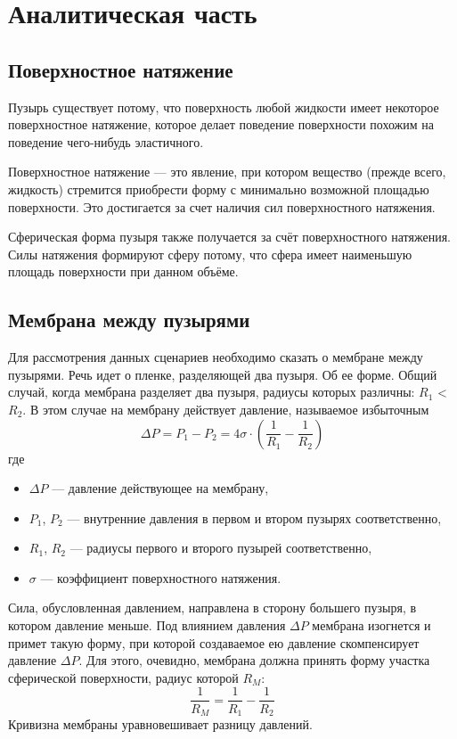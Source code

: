 \chapter{Аналитическая часть}
\section{Поверхностное натяжение}
Пузырь существует потому, что поверхность любой жидкости имеет некоторое поверхностное натяжение, которое делает поведение поверхности похожим на поведение чего-нибудь эластичного.

Поверхностное натяжение \cite{surface_tension} — это явление, при котором вещество (прежде всего, жидкость) стремится приобрести форму с минимально возможной площадью поверхности. Это достигается за счет наличия сил поверхностного натяжения.

Сферическая форма пузыря также получается за счёт поверхностного натяжения. Силы натяжения формируют сферу потому, что сфера имеет наименьшую площадь поверхности при данном объёме.  

\section{Мембрана между пузырями}

Для рассмотрения данных сценариев необходимо сказать о мембране между пузырями. Речь идет о пленке, разделяющей два пузыря. Об ее форме. Общий случай, когда мембрана разделяет два пузыря, радиусы которых различны: $R_{1}$ < $R_{2}$. В этом случае на мембрану действует давление, называемое избыточным \cite{geguzin}
\begin{equation}
\Delta P = P_{1} - P_{2} = 4 \sigma \cdot (\frac{1}{R_{1}}-\frac{1}{R_{2}})
\end{equation}
где
\begin{itemize}
	\item $\Delta P$ --- давление действующее на мембрану,
	\item $P_{1}$, $P_{2}$ --- внутренние давления в первом и втором пузырях соответственно,
	\item $R_{1}$, $R_{2}$ --- радиусы первого и второго пузырей соответственно,
	\item $\sigma$ --- коэффициент поверхностного натяжения.
\end{itemize}
Сила, обусловленная давлением, направлена в сторону большего пузыря, в котором давление меньше. Под влиянием давления $\Delta P$ мембрана изогнется и примет такую форму, при которой создаваемое ею давление скомпенсирует давление $\Delta P$. Для этого, очевидно, мембрана должна принять форму участка сферической поверхности, радиус которой $R_{M}$:
\begin{equation}
\frac{1}{R_{M}} = \frac{1}{R_{1}} - \frac{1}{R_{2}}
\end{equation}
Кривизна мембраны уравновешивает разницу давлений.

